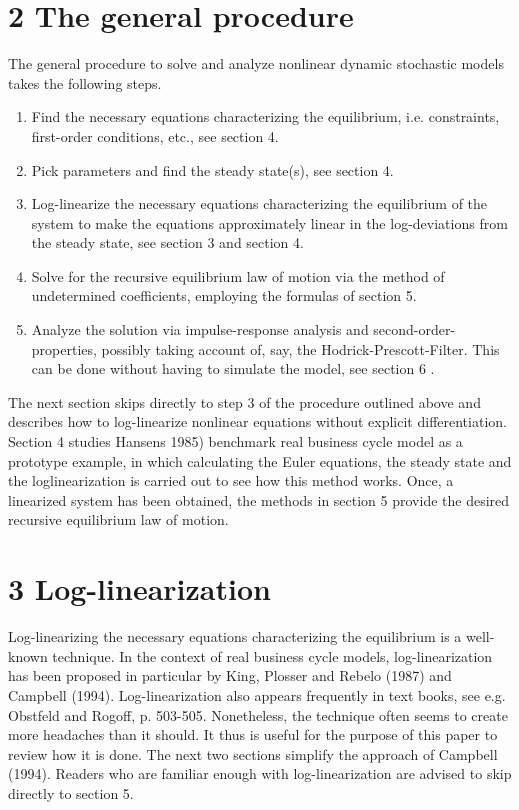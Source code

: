 \documentclass[10pt]{article}
\begin{document}
\section*{2 The general procedure}
The general procedure to solve and analyze nonlinear dynamic stochastic models takes the following steps.

\begin{enumerate}
  \item Find the necessary equations characterizing the equilibrium, i.e. constraints, first-order conditions, etc., see section 4.
  \item Pick parameters and find the steady state(s), see section 4.
  \item Log-linearize the necessary equations characterizing the equilibrium of the system to make the equations approximately linear in the log-deviations from the steady state, see section 3 and section 4.
  \item Solve for the recursive equilibrium law of motion via the method of undetermined coefficients, employing the formulas of section 5.
  \item Analyze the solution via impulse-response analysis and second-order-properties, possibly taking account of, say, the Hodrick-Prescott-Filter. This can be done without having to simulate the model, see section 6 .
\end{enumerate}

The next section skips directly to step 3 of the procedure outlined above and describes how to log-linearize nonlinear equations without explicit differentiation. Section 4 studies Hansens 1985) benchmark real business cycle model as a prototype example, in which calculating the Euler equations, the steady state and the loglinearization is carried out to see how this method works. Once, a linearized system has been obtained, the methods in section 5 provide the desired recursive equilibrium law of motion.

\section*{3 Log-linearization}
Log-linearizing the necessary equations characterizing the equilibrium is a well-known technique. In the context of real business cycle models, log-linearization has been proposed in particular by King, Plosser and Rebelo (1987) and Campbell (1994). Log-linearization also appears frequently in text books, see e.g. Obstfeld and Rogoff, p. 503-505. Nonetheless, the technique often seems to create more headaches than it should. It thus is useful for the purpose of this paper to review how it is done. The next two sections simplify the approach of Campbell (1994). Readers who are familiar enough with log-linearization are advised to skip directly to section 5.
\end{document}

